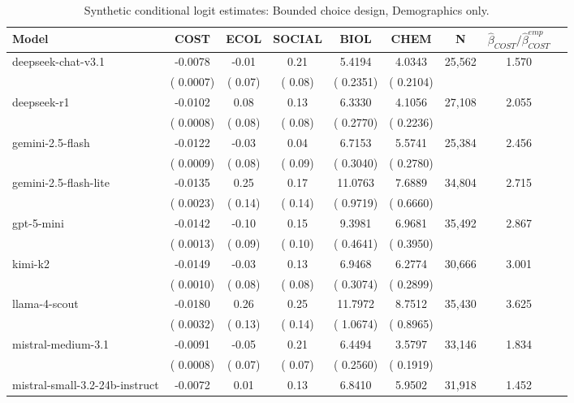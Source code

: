 \begin{table}[h]
\centering
\caption{Synthetic conditional logit estimates: Bounded choice design, Demographics only.}
\label{tab:syn-clogit-bounded-withoutBeliefs}
\begin{threeparttable}
\footnotesize
\begin{tabular}{lcccccccr}
\toprule
Model & COST & ECOL & SOCIAL & BIOL & CHEM & N & $\hat\beta_{COST}/\hat\beta_{COST}^{emp}$ \\
\midrule
deepseek-chat-v3.1 &   -0.0078 &     -0.01 &      0.21 &    5.4194 &    4.0343 &    25,562 &  1.570 \\
 & (   0.0007) & (     0.07) & (     0.08) & (   0.2351) & (   0.2104) & & \\
deepseek-r1 &   -0.0102 &      0.08 &      0.13 &    6.3330 &    4.1056 &    27,108 &  2.055 \\
 & (   0.0008) & (     0.08) & (     0.08) & (   0.2770) & (   0.2236) & & \\
gemini-2.5-flash &   -0.0122 &     -0.03 &      0.04 &    6.7153 &    5.5741 &    25,384 &  2.456 \\
 & (   0.0009) & (     0.08) & (     0.09) & (   0.3040) & (   0.2780) & & \\
gemini-2.5-flash-lite &   -0.0135 &      0.25 &      0.17 &   11.0763 &    7.6889 &    34,804 &  2.715 \\
 & (   0.0023) & (     0.14) & (     0.14) & (   0.9719) & (   0.6660) & & \\
gpt-5-mini &   -0.0142 &     -0.10 &      0.15 &    9.3981 &    6.9681 &    35,492 &  2.867 \\
 & (   0.0013) & (     0.09) & (     0.10) & (   0.4641) & (   0.3950) & & \\
kimi-k2 &   -0.0149 &     -0.03 &      0.13 &    6.9468 &    6.2774 &    30,666 &  3.001 \\
 & (   0.0010) & (     0.08) & (     0.08) & (   0.3074) & (   0.2899) & & \\
llama-4-scout &   -0.0180 &      0.26 &      0.25 &   11.7972 &    8.7512 &    35,430 &  3.625 \\
 & (   0.0032) & (     0.13) & (     0.14) & (   1.0674) & (   0.8965) & & \\
mistral-medium-3.1 &   -0.0091 &     -0.05 &      0.21 &    6.4494 &    3.5797 &    33,146 &  1.834 \\
 & (   0.0008) & (     0.07) & (     0.07) & (   0.2560) & (   0.1919) & & \\
mistral-small-3.2-24b-instruct &   -0.0072 &      0.01 &      0.13 &    6.8410 &    5.9502 &    31,918 &  1.452 \\

\end{tabular}
\end{threeparttable}
\end{table}
